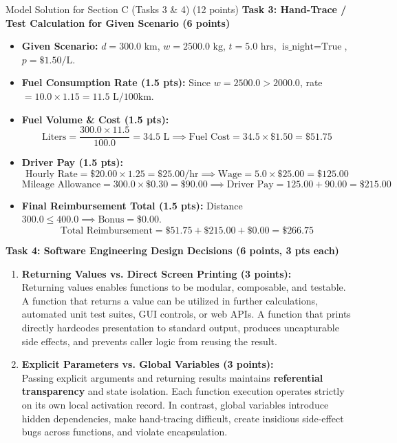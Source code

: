 \documentclass[11pt,a4paper]{article}
\begin{document}
\newpage

\begin{solbox}{Model Solution for Section C (Tasks 3 \& 4) (12 points)}
\textbf{Task 3: Hand-Trace / Test Calculation for Given Scenario (6 points)}
\begin{itemize}[leftmargin=2em, itemsep=3pt]
  \item \textbf{Given Scenario:} $d = 300.0\text{ km}$, $w = 2500.0\text{ kg}$, $t = 5.0\text{ hrs}$, $\text{is\_night} = \text{True}$, $p = \$1.50/\text{L}$.
  \item \textbf{Fuel Consumption Rate (1.5 pts):} Since $w = 2500.0 > 2000.0$, rate $= 10.0 \times 1.15 = 11.5\text{ L/100km}$.
  \item \textbf{Fuel Volume \& Cost (1.5 pts):}
    $$\text{Liters} = \frac{300.0 \times 11.5}{100.0} = 34.5\text{ L} \implies \text{Fuel Cost} = 34.5 \times \$1.50 = \mathbf{\$51.75}$$
  \item \textbf{Driver Pay (1.5 pts):}
    $$\text{Hourly Rate} = \$20.00 \times 1.25 = \$25.00/\text{hr} \implies \text{Wage} = 5.0 \times \$25.00 = \$125.00$$
    $$\text{Mileage Allowance} = 300.0 \times \$0.30 = \$90.00 \implies \text{Driver Pay} = 125.00 + 90.00 = \mathbf{\$215.00}$$
  \item \textbf{Final Reimbursement Total (1.5 pts):} Distance $300.0 \le 400.0 \implies \text{Bonus} = \$0.00$.
    $$\text{Total Reimbursement} = \$51.75 + \$215.00 + \$0.00 = \mathbf{\$266.75}$$
\end{itemize}

\vspace{0.25cm}
\textbf{Task 4: Software Engineering Design Decisions (6 points, 3 pts each)}
\begin{enumerate}[label=\alph*),leftmargin=2em, itemsep=4pt]
  \item \textbf{Returning Values vs. Direct Screen Printing (3 points):} \\
    Returning values enables functions to be modular, composable, and testable. A function that returns a value can be utilized in further calculations, automated unit test suites, GUI controls, or web APIs. A function that prints directly hardcodes presentation to standard output, produces uncapturable side effects, and prevents caller logic from reusing the result.
  \item \textbf{Explicit Parameters vs. Global Variables (3 points):} \\
    Passing explicit arguments and returning results maintains \textbf{referential transparency} and state isolation. Each function execution operates strictly on its own local activation record. In contrast, global variables introduce hidden dependencies, make hand-tracing difficult, create insidious side-effect bugs across functions, and violate encapsulation.
\end{enumerate}
\end{solbox}
\end{document}
